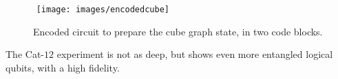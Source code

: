 \documentclass[10pt, twocolumn, aps, nofootinbib, longbibliography, nobibnotes, superscriptaddress]{revtex4-1} %
\begin{document}
\begin{figure}
$\!\!\!\!\!$ \texttt{[image: images/encodedcube]} $\;\;$ 
\caption{Encoded circuit to prepare the cube graph state, in two code blocks.} \label{f:encodedcube}
\end{figure}

\smallskip
The Cat-$12$ experiment is not as deep, but shows even more entangled logical qubits, with a high fidelity.  

%
%
\end{document}
